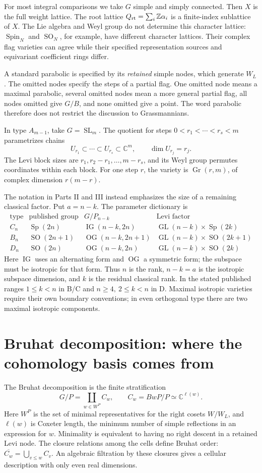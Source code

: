 \documentclass[11pt,letterpaper]{article}
\newcommand{\Z}{\mathbb Z}\newcommand{\Q}{\mathbb Q}\newcommand{\C}{\mathbb C}
\newcommand{\SL}{\operatorname{SL}}\newcommand{\GL}{\operatorname{GL}}
\newcommand{\SO}{\operatorname{SO}}\newcommand{\Sp}{\operatorname{Sp}}
\newcommand{\Spin}{\operatorname{Spin}}\newcommand{\IG}{\operatorname{IG}}
\newcommand{\OG}{\operatorname{OG}}\newcommand{\Gr}{\operatorname{Gr}}
\theoremstyle{definition}\newtheorem{definition}[theorem]{Definition}
\begin{document}
For most integral comparisons we take \(G\) simple and simply connected.
Then \(X\) is the full weight lattice. The root lattice
\(Q_{\rm rt}=\sum_i\Z\alpha_i\) is a finite-index sublattice of \(X\).
The Lie algebra and Weyl group do not determine this character lattice:
\(\Spin_N\) and \(\SO_N\), for example, have different character lattices.
Their complex flag varieties can agree while their specified
representation sources and equivariant coefficient rings differ.

A standard parabolic is specified by its \emph{retained} simple nodes,
which generate \(W_L\). The omitted nodes specify the steps of a
partial flag. One omitted node means a maximal parabolic, several
omitted nodes mean a more general partial flag, all nodes omitted
give \(G/B\), and none omitted give a point. The word parabolic
therefore does not restrict the discussion to Grassmannians.

In type \(A_{m-1}\), take \(G=\SL_m\). The quotient for steps
\(0<r_1<\cdots<r_s<m\) parametrizes chains
\[
 U_{r_1}\subset\cdots\subset U_{r_s}\subset\C^m,\qquad
 \dim U_{r_j}=r_j.
\]
The Levi block sizes are \(r_1,r_2-r_1,\ldots,m-r_s\), and its Weyl
group permutes coordinates within each block. For one step \(r\),
the variety is \(\Gr(r,m)\), of complex dimension \(r(m-r)\).

The notation in Parts II and III instead emphasizes the size of a
remaining classical factor. Put \(a=n-k\). The parameter dictionary is
\[
\begin{array}{c|c|c|c}
\text{type}&\text{published group}&G/P_{n-k}&\text{Levi factor}\\ \hline
C_n&\Sp(2n)&\IG(n-k,2n)&\GL(n-k)\times\Sp(2k)\\
B_n&\SO(2n+1)&\OG(n-k,2n+1)&\GL(n-k)\times\SO(2k+1)\\
D_n&\SO(2n)&\OG(n-k,2n)&\GL(n-k)\times\SO(2k)
\end{array}
\]
Here \(\IG\) uses an alternating form and \(\OG\) a symmetric form;
the subspace must be isotropic for that form. Thus \(n\) is the rank,
\(n-k=a\) is the isotropic subspace dimension, and \(k\) is the residual
classical rank. In the stated published ranges \(1\le k<n\) in B/C
and \(n\ge4,\ 2\le k<n\) in D. Maximal isotropic varieties require
their own boundary conventions; in even orthogonal type there are
two maximal isotropic components.

\section{Bruhat decomposition: where the cohomology basis comes from}
The Bruhat decomposition is the finite stratification
\[
 G/P=\coprod_{w\in W^P} C_w,\qquad
 C_w=BwP/P\simeq\C^{\ell(w)}.
 \tag{1}
\]
Here \(W^P\) is the set of minimal representatives for the right cosets
\(W/W_L\), and \(\ell(w)\) is Coxeter length, the minimum number of
simple reflections in an expression for \(w\). Minimality is equivalent
to having no right descent in a retained Levi node. The closure
relations among the cells define Bruhat order:
\(\overline{C_w}=\bigcup_{v\le w}C_v\).
An algebraic filtration by these closures gives a cellular description
with only even real dimensions.
\end{document}
